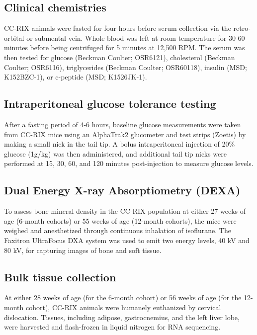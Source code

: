 \documentclass[
]{article}
\begin{document}
\subsection{Clinical chemistries}\label{clinical-chemistries}

CC-RIX animals were fasted for four hours before serum collection via
the retro-orbital or submental vein. Whole blood was left at room
temperature for 30-60 minutes before being centrifuged for 5 minutes at
12,500 RPM. The serum was then tested for glucose (Beckman Coulter;
OSR6121), cholesterol (Beckman Coulter; OSR6116), triglycerides (Beckman
Coulter; OSR60118), insulin (MSD; K152BZC-1), or c-peptide (MSD;
K1526JK-1).

\subsection{Intraperitoneal glucose tolerance
testing}\label{intraperitoneal-glucose-tolerance-testing}

After a fasting period of 4-6 hours, baseline glucose measurements were
taken from CC-RIX mice using an AlphaTrak2 glucometer and test strips
(Zoetis) by making a small nick in the tail tip. A bolus intraperitoneal
injection of 20\% glucose (1g/kg) was then administered, and additional
tail tip nicks were performed at 15, 30, 60, and 120 minutes
post-injection to measure glucose levels.

\subsection{Dual Energy X-ray Absorptiometry
(DEXA)}\label{dual-energy-x-ray-absorptiometry-dexa}

To assess bone mineral density in the CC-RIX population at either 27
weeks of age (6-month cohorts) or 55 weeks of age (12-month cohorts),
the mice were weighed and anesthetized through continuous inhalation of
isoflurane. The Faxitron UltraFocus DXA system was used to emit two
energy levels, 40 kV and 80 kV, for capturing images of bone and soft
tissue.

\subsection{Bulk tissue collection}\label{bulk-tissue-collection}

At either 28 weeks of age (for the 6-month cohort) or 56 weeks of age
(for the 12-month cohort), CC-RIX animals were humanely euthanized by
cervical dislocation. Tissues, including adipose, gastrocnemius, and the
left liver lobe, were harvested and flash-frozen in liquid nitrogen for
RNA sequencing.
\end{document}
